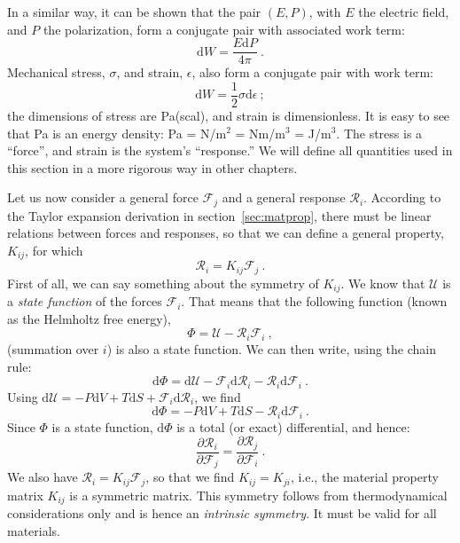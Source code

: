 In a similar way, it can be shown that the pair $(E,P)$, with $E$ the electric field, and $P$ the polarization, form a  conjugate pair with associated work term:
\begin{equation}
	\mathrm{d}W = \frac{E\mathrm{d}P}{4\pi}\ .
\end{equation}
Mechanical stress, $\sigma$, and strain, $\epsilon$, also form a conjugate pair with work term:
\begin{equation}
	\mathrm{d}W = \frac{1}{2}\sigma\mathrm{d}\epsilon\ ;
\end{equation}
the dimensions of stress are Pa(scal), and strain is dimensionless.  It is easy to see that Pa is an energy density: Pa = N/m$^2$ = Nm/m$^3$ = J/m$^3$.  The stress is a ``force'', and strain is the system's ``response.''  We will define all quantities used in this section in a more rigorous way in other chapters.

Let us now consider a general force $\mathcal{F}_j$ and a general response $\mathcal{R}_i$.  According to the Taylor expansion derivation in section~\ref{sec:matprop}, there must be linear relations between forces and responses, so that we can define a general property, $K_{ij}$, for which
\begin{equation}
	\mathcal{R}_i = K_{ij}\mathcal{F}_j\ .
\end{equation}
First of all, we can say something about the symmetry of $K_{ij}$.  We know that $\mathcal{U}$ is a \textit{state function} of the forces $\mathcal{F}_i$.  That means that the following function (known as the Helmholtz free energy), 
\begin{equation}
	\Phi = \mathcal{U} - \mathcal{R}_i\mathcal{F}_i\ ,
\end{equation}
(summation over $i$) is also a state function.  We can then write, using the chain rule:
\begin{equation}
	\mathrm{d}\Phi = \mathrm{d}\mathcal{U}-\mathcal{F}_i\mathrm{d}\mathcal{R}_i-\mathcal{R}_i\mathrm{d}\mathcal{F}_i\ .
\end{equation}
Using $\mathrm{d}\mathcal{U} = -P\mathrm{d}V+T\mathrm{d}S+\mathcal{F}_i\mathrm{d}\mathcal{R}_i$, we find
\begin{equation}
	\mathrm{d}\Phi = -P\mathrm{d}V+T\mathrm{d}S-\mathcal{R}_i\mathrm{d}\mathcal{F}_i\ .
\end{equation}
Since $\Phi$ is a state function, $\mathrm{d}\Phi$ is a total (or exact) differential, and hence:
\begin{equation}
	\frac{\partial \mathcal{R}_i}{\partial\mathcal{F}_j} = \frac{\partial \mathcal{R}_j}{\partial\mathcal{F}_i}\ .
\end{equation}
We also have $\mathcal{R}_i = K_{ij}\mathcal{F}_j$, so that we find $K_{ij} = K_{ji}$, i.e., the material property matrix $K_{ij}$ is a symmetric matrix.  This symmetry follows from thermodynamical considerations only and is hence an \textit{intrinsic symmetry}.  It must be valid for all materials.

